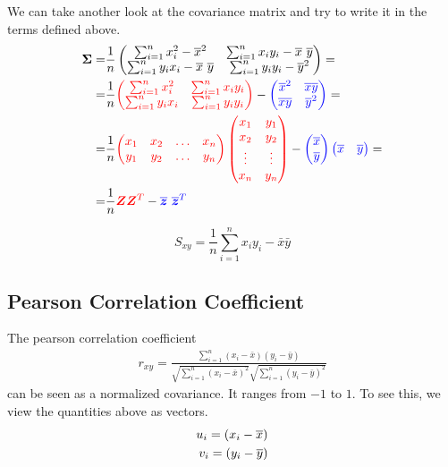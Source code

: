 We can take another look at the covariance matrix and try to write it in the terms defined above.
\begin{align}
  \bm{\Sigma} =& \frac{1}{n} \begin{pmatrix}
    \sum_{i=1}^{n}x_{i}^2 - \mean{x}^2      & \sum_{i=1}^{n}x_{i}y_{i} - \mean{x} \ \mean{y} \\
    \sum_{i=1}^{n}y_{i}x_{i} - \mean{x} \ \mean{y} & \sum_{i=1}^{n}y_{i}y_{i} -  \mean{y}^2
  \end{pmatrix} = \\
=& \frac{1}{n} \red{\begin{pmatrix}
  \sum_{i=1}^{n}x_{i}^2    & \sum_{i=1}^{n}x_{i}y_{i} \\
  \sum_{i=1}^{n}y_{i}x_{i} & \sum_{i=1}^{n}y_{i}y_{i} 
\end{pmatrix}} - 
\blue{\begin{pmatrix}
  \mean{x}^2        &  \mean{x} \mean{y} \\
  \mean{x} \mean{y} &  \mean{y}^2
\end{pmatrix}} = \\
=& \frac{1}{n}\red{
\begin{pmatrix}
    x_{1} & x_{2} & \hdots & x_{n} \\
    y_{1} & y_{2} & \hdots & y_{n}
\end{pmatrix}
\begin{pmatrix}
    x_{1} & y_{1} \\
    x_{2} & y_{2} \\
    \vdots  & \vdots \\
    x_{n} & y_{n}
\end{pmatrix}} - \blue{\begin{pmatrix}
  \mean{x} \\
  \mean{y}
\end{pmatrix} \begin{pmatrix}
  \mean{x} &
  \mean{y}
\end{pmatrix}} = \\
=& \frac{1}{n}\red{\bm{ZZ}^T}- \blue{\mean{\bm{z}} \ \mean{\bm{z}}^T}
\end{align}

\begin{equation*}
S_{xy}=\frac{1}{n}\sum_{i=1}^{n}x_{i}y_{i}-\bar{x}\bar{y}
\end{equation*}
    
    
\subsection {Pearson Correlation Coefficient}
The pearson correlation coefficient 
\begin{align}
    r_{xy} = \frac{\sum_{i=1}^{n}(x_{i}-\bar{x})(y_{i}-\bar{y})}{\sqrt{\sum_{i=1}^{n}(x_{i}-\bar{x})^2}\sqrt{\sum_{i=1}^{n}(y_{i}-\bar{y})^2}}
\end{align}
can be seen as a normalized covariance.
It ranges from $-1$ to $1$.
  To see this, we view the quantities above as vectors.
\begin{align}
  u_{i} = (x_{i}-\overline{x}) \\
  v_{i} = (y_{i}-\overline{y})
\end{align}
  
